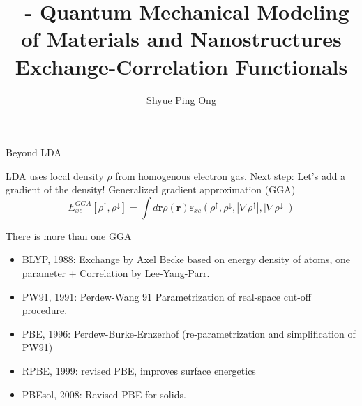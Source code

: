 \documentclass[aspectratio=169]{beamer}
\title[\classname Exchange-Correlation Functionals]{\classname~- Quantum Mechanical Modeling of Materials and Nanostructures\\Exchange-Correlation Functionals}
\author{Shyue Ping Ong}
\institute[UCSD]{University of California, San Diego\\
\medskip
}
\date{\classyear} %
\let \vec \mathbf
\begin{document}
\begin{frame}
    \titlepage %
\end{frame}


\begin{frame}{Beyond LDA}

LDA uses local density $\rho$ from homogenous electron gas.\newline
\newline
Next step: Let’s add a gradient of the density!\newline
\newline
Generalized gradient approximation (GGA)
\begin{equation*}
    E_{xc}^{GGA}[\rho^\uparrow, \rho^\downarrow] = \int d \vec{r} \rho(\vec{r})\varepsilon_{xc}(\rho^\uparrow, \rho^\downarrow, |\nabla\rho^\uparrow|, |\nabla\rho^\downarrow|)
\end{equation*}

\end{frame}

\begin{frame}{There is more than one GGA}
\begin{itemize}
    \item BLYP, 1988: Exchange by Axel Becke based on energy density of atoms, one parameter + Correlation by Lee-Yang-Parr.\cite{beckeDensityfunctionalExchangeenergyApproximation1988}
    \item PW91, 1991: Perdew-Wang 91 Parametrization of real-space cut-off procedure.\cite{burkeDerivationGeneralizedGradient1998}
    \item PBE, 1996: Perdew-Burke-Ernzerhof (re-parametrization and simplification of PW91)\cite{perdewGeneralizedGradientApproximation1996}
    \item RPBE, 1999: revised PBE, improves surface energetics
    \item PBEsol, 2008: Revised PBE for solids.\cite{perdewRestoringDensityGradientExpansion2008a}

\end{itemize}


\end{frame} 
\end{document}
